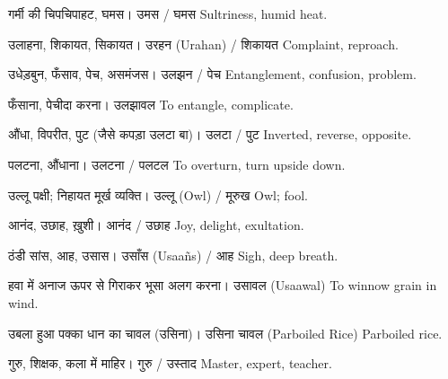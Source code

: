 %
{गर्मी की चिपचिपाहट, घमस।}%
{उमस / घमस}%
{Sultriness, humid heat.}

%
{उलाहना, शिकायत, सिकायत।}%
{उरहन (Urahan) / शिकायत}%
{Complaint, reproach.}

%
{उधेड़बुन, फँसाव, पेच, असमंजस।}%
{उलझन / पेच}%
{Entanglement, confusion, problem.}

%
{फँसाना, पेचीदा करना।}%
{उलझावल}%
{To entangle, complicate.}

%
{औंधा, विपरीत, पुट (जैसे कपड़ा उलटा बा)।}%
{उलटा / पुट}%
{Inverted, reverse, opposite.}

%
{पलटना, औंधाना।}%
{उलटना / पलटल}%
{To overturn, turn upside down.}

%
{उल्लू पक्षी; निहायत मूर्ख व्यक्ति।}%
{उल्लू (Owl) / मूरुख}%
{Owl; fool.}

%
{आनंद, उछाह, ख़ुशी।}%
{आनंद / उछाह}%
{Joy, delight, exultation.}

%
{ठंडी सांस, आह, उसास।}%
{उसाँस (Usaañs) / आह}%
{Sigh, deep breath.}

%
{हवा में अनाज ऊपर से गिराकर भूसा अलग करना।}%
{उसावल (Usaawal)}%
{To winnow grain in wind.}

%
{उबला हुआ पक्का धान का चावल (उसिना)।}%
{उसिना चावल (Parboiled Rice)}%
{Parboiled rice.}

%
{गुरु, शिक्षक, कला में माहिर।}%
{गुरु / उस्ताद}%
{Master, expert, teacher.}

